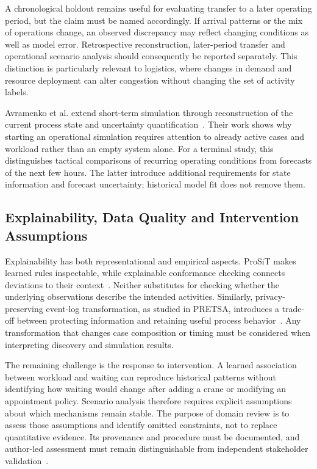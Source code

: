 A chronological holdout remains useful for evaluating transfer to a later operating period, but the claim must be named accordingly. If arrival patterns or the mix of operations change, an observed discrepancy may reflect changing conditions as well as model error. Retrospective reconstruction, later-period transfer and operational scenario analysis should consequently be reported separately. This distinction is particularly relevant to logistics, where changes in demand and resource deployment can alter congestion without changing the set of activity labels.

Avramenko et al. extend short-term simulation through reconstruction of the current process state and uncertainty quantification~\cite{RWAvramenko2026ShortTerm}. Their work shows why starting an operational simulation requires attention to already active cases and workload rather than an empty system alone. For a terminal study, this distinguishes tactical comparisons of recurring operating conditions from forecasts of the next few hours. The latter introduce additional requirements for state information and forecast uncertainty; historical model fit does not remove them.

\subsection{Explainability, Data Quality and Intervention Assumptions}

Explainability has both representational and empirical aspects. ProSiT makes learned rules inspectable, while explainable conformance checking connects deviations to their context~\cite{Vinci2026prosit,RWMehr2023Explainable}. Neither substitutes for checking whether the underlying observations describe the intended activities. Similarly, privacy-preserving event-log transformation, as studied in PRETSA, introduces a trade-off between protecting information and retaining useful process behavior~\cite{FahrenkrogPetersen2019PRETSA}. Any transformation that changes case composition or timing must be considered when interpreting discovery and simulation results.

The remaining challenge is the response to intervention. A learned association between workload and waiting can reproduce historical patterns without identifying how waiting would change after adding a crane or modifying an appointment policy. Scenario analysis therefore requires explicit assumptions about which mechanisms remain stable. The purpose of domain review is to assess those assumptions and identify omitted constraints, not to replace quantitative evidence. Its provenance and procedure must be documented, and author-led assessment must remain distinguishable from independent stakeholder validation~\cite{Sulis2026SimulationReview,Sargent2013Validation}.

